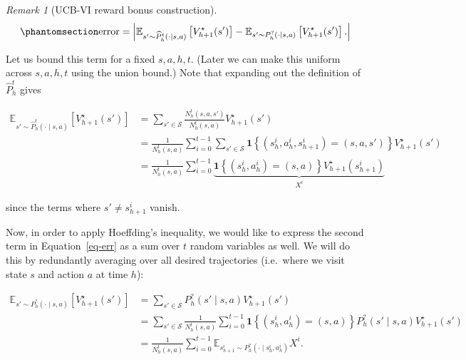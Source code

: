 \documentclass[
  letterpaper,
  DIV=11,
  numbers=noendperiod]{scrreprt}
\theoremstyle{plain}
\theoremstyle{plain}
\theoremstyle{definition}
\theoremstyle{definition}
\theoremstyle{remark}
\newtheorem{refremark}{Remark}[chapter]
\begin{document}
\begin{refremark}[UCB-VI reward bonus construction]
\begin{equation}\phantomsection\label{eq-err}{
\text{error} = \left| \mathbb{E}_{s' \sim \widehat{P}_h^t(\cdot \mid s, a)} \left[ V^\star_{h+1}(s') \right] - \mathbb{E}_{s' \sim P^?_h(\cdot \mid s, a)} \left[ V^\star_{h+1}(s') \right]. \right|
}\end{equation}

Let us bound this term for a fixed \(s, a, h, t\). (Later we can make
this uniform across \(s, a, h, t\) using the union bound.) Note that
expanding out the definition of \(\widehat{P}_h^t\) gives

\[\begin{aligned}
        \mathbb{E}_{s' \sim \widehat{P}_h^t(\cdot \mid s, a)} \left[ V^\star_{h+1}(s') \right] & = \sum_{s' \in \mathcal{S}} \frac{N^t_h(s, a, s')}{N^t_h(s, a)} V^\star_{h+1}(s')                                                     \\
                                                                                   & = \frac{1}{N^t_h(s, a)} \sum_{i=0}^{t-1} \sum_{s' \in \mathcal{S}} \mathbf{1}\left\{ (s_h^i, a_h^i, s_{h+1}^i) = (s, a, s') \right\} V^\star_{h+1}(s') \\
                                                                                   & = \frac{1}{N^t_h(s, a)} \sum_{i=0}^{t-1} \underbrace{\mathbf{1}\left\{ (s_h^i, a_h^i) = (s, a) \right\} V^\star_{h+1}(s_{h+1}^i)}_{X^i}
\end{aligned}\]

since the terms where \(s' \neq s_{h+1}^i\) vanish.

Now, in order to apply Hoeffding's inequality, we would like to express
the second term in Equation~\ref{eq-err} as a sum over \(t\) random
variables as well. We will do this by redundantly averaging over all
desired trajectories (i.e.~where we visit state \(s\) and action \(a\)
at time \(h\)):

\[\begin{aligned}
        \mathbb{E}_{s' \sim P^?_h(\cdot \mid s, a)} \left[ V^\star_{h+1}(s') \right]
         & = \sum_{s' \in \mathcal{S}} P^?_h(s' \mid s, a) V^\star_{h+1}(s')                                                                              \\
         & = \sum_{s' \in \mathcal{S}} \frac{1}{N^t_h(s, a)} \sum_{i=0}^{t-1} \mathbf{1}\left\{ (s_h^i, a_h^i) = (s, a) \right\} P^?_h(s' \mid s, a) V^\star_{h+1}(s') \\
         & = \frac{1}{N^t_h(s, a)} \sum_{i=0}^{t-1} \mathbb{E}_{s_{h+1}^i \sim P^?_{h}(\cdot \mid s_h^i, a_h^i)} X^i.
\end{aligned}
\]


\end{refremark}
\end{document}
